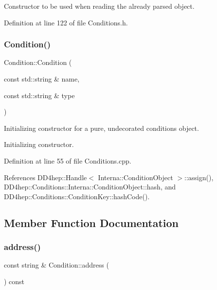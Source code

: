 Constructor to be used when reading the already parsed object. 



Definition at line 122 of file Conditions.\+h.

\hypertarget{class_d_d4hep_1_1_conditions_1_1_condition_a277c98ec82a48b428fa0d92199cd9e67}{}\label{class_d_d4hep_1_1_conditions_1_1_condition_a277c98ec82a48b428fa0d92199cd9e67} 
\subsubsection{\texorpdfstring{Condition()}{Condition()}\hspace{0.1cm}{\footnotesize\ttfamily [5/5]}}
{\footnotesize\ttfamily Condition\+::\+Condition (\begin{DoxyParamCaption}\item[{const std\+::string \&}]{name,  }\item[{const std\+::string \&}]{type }\end{DoxyParamCaption})}



Initializing constructor for a pure, undecorated conditions object. 

Initializing constructor. 

Definition at line 55 of file Conditions.\+cpp.



References D\+D4hep\+::\+Handle$<$ Interna\+::\+Condition\+Object $>$\+::assign(), D\+D4hep\+::\+Conditions\+::\+Interna\+::\+Condition\+Object\+::hash, and D\+D4hep\+::\+Conditions\+::\+Condition\+Key\+::hash\+Code().



\subsection{Member Function Documentation}
\hypertarget{class_d_d4hep_1_1_conditions_1_1_condition_a76a22a570def6fe909d6c955445441df}{}\label{class_d_d4hep_1_1_conditions_1_1_condition_a76a22a570def6fe909d6c955445441df} 
\subsubsection{\texorpdfstring{address()}{address()}}
{\footnotesize\ttfamily const string \& Condition\+::address (\begin{DoxyParamCaption}{ }\end{DoxyParamCaption}) const}



